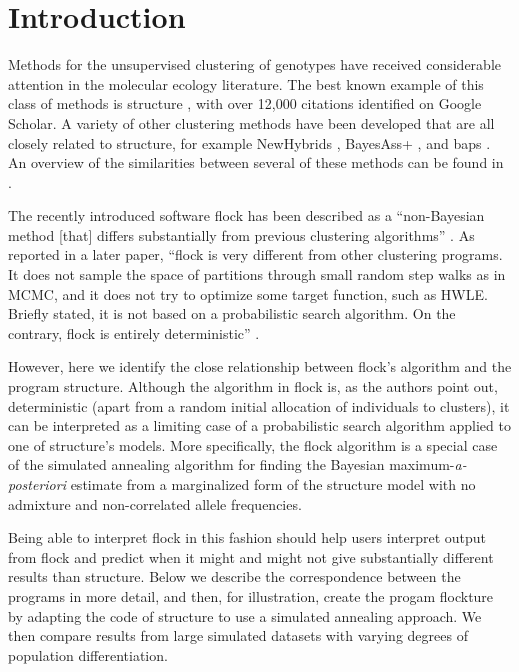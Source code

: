 
\section*{Introduction}
Methods for the unsupervised clustering of genotypes have received 
considerable attention in the molecular ecology literature.  
The best known example of this class of methods is {\sc structure} 
\citep{Pritchardetal2000}, with over 12,000 citations identified on 
Google Scholar.  A variety of other 
clustering methods have been developed that are all closely related to 
{\sc structure}, for example {\sc NewHybrids} \citep{And&Tho2002}, {\sc 
BayesAss+} \citep{Wil&Ran2003}, and {\sc baps} 
\citep{Coranderetal2004}. An overview of the similarities between several of these methods can be 
found in \citet{Anderson2009PGAC}.

The recently introduced software {\sc flock} \citep{Duc&Tur2009} has
been described
as a ``non-Bayesian method [that] 
differs substantially from previous 
clustering algorithms'' \citep[][p.~1333]{Duc&Tur2009}. As reported
in a later paper, ``{\sc flock} is very different from  other clustering 
programs. It does not sample the space of partitions through small 
random step walks as in MCMC, and it does not try to optimize some 
target function, such as HWLE\@. Briefly stated, it is not based on a 
probabilistic search algorithm. On the contrary, {\sc flock} is 
entirely deterministic'' \citep[][p.~736]{Duc&Tur2012}.

However, here we identify 
the close relationship between {\sc flock}'s algorithm and the program
{\sc structure}.  Although the algorithm in {\sc flock}
is, as the authors point out, deterministic (apart from a random initial allocation of 
individuals to clusters), it can be interpreted as a 
limiting case of a probabilistic search algorithm applied to one of {\sc structure}'s
models.  More specifically, the {\sc flock} 
algorithm is a special case of the simulated annealing
algorithm for finding the Bayesian maximum-{\em a-posteriori}
estimate from a marginalized form of the {\sc structure} model with no
admixture and non-correlated allele frequencies.  

Being able to interpret {\sc flock} in this fashion should help users
interpret output from {\sc flock} and predict when it might and might not
give substantially different results than {\sc structure}. Below we describe
the correspondence between the programs in more detail, and then, for illustration,
create the progam {\sc flockture} by adapting the code of {\sc structure} to 
use a simulated annealing approach. We then compare results from large simulated 
datasets with varying degrees of population differentiation. 

